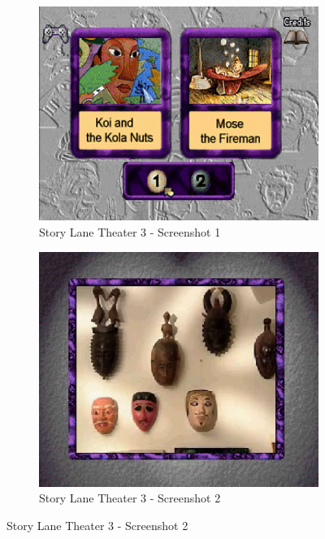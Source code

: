 \begin{figure}[H]
    \centering
    \begin{subfigure}{0.45\textwidth}
        \centering
        \includegraphics[width=\linewidth]{Games/StoryLaneTheater/Images/StoryLaneTheater3Image1.png}
        \caption{Story Lane Theater 3 - Screenshot 1}
    \end{subfigure}
    \begin{subfigure}{0.45\textwidth}
        \includegraphics[width=\linewidth]{Games/StoryLaneTheater/Images/StoryLaneTheater3Image2.png}
        \caption{Story Lane Theater 3 - Screenshot 2}
    \end{subfigure}


\end{figure}
